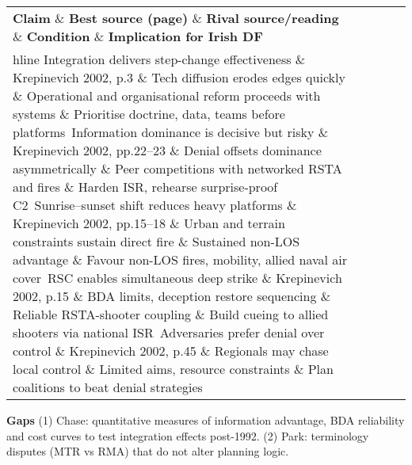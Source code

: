  
\begin{tabular}{p{3.2cm}p{4.2cm}p{3.6cm}p{3.2cm}p{4.2cm}}
	\textbf{Claim} \& \textbf{Best source (page)} \& \textbf{Rival source/reading} \& \textbf{Condition} \& \textbf{Implication for Irish DF}\\hline
	Integration delivers step-change effectiveness \& Krepinevich 2002, p.3 \& Tech diffusion erodes edges quickly \& Operational and organisational reform proceeds with systems \& Prioritise doctrine, data, teams before platforms\
	Information dominance is decisive but risky \& Krepinevich 2002, pp.22–23 \& Denial offsets dominance asymmetrically \& Peer competitions with networked RSTA and fires \& Harden ISR, rehearse surprise-proof C2\
	Sunrise–sunset shift reduces heavy platforms \& Krepinevich 2002, pp.15–18 \& Urban and terrain constraints sustain direct fire \& Sustained non-LOS advantage \& Favour non-LOS fires, mobility, allied naval air cover\
	RSC enables simultaneous deep strike \& Krepinevich 2002, p.15 \& BDA limits, deception restore sequencing \& Reliable RSTA-shooter coupling \& Build cueing to allied shooters via national ISR\
	Adversaries prefer denial over control \& Krepinevich 2002, p.45 \& Regionals may chase local control \& Limited aims, resource constraints \& Plan coalitions to beat denial strategies\
\end{tabular}

\textbf{Gaps}
(1) Chase: quantitative measures of information advantage, BDA reliability and cost curves to test integration effects post-1992.
(2) Park: terminology disputes (MTR vs RMA) that do not alter planning logic.

\parencite{METZ_2000}
